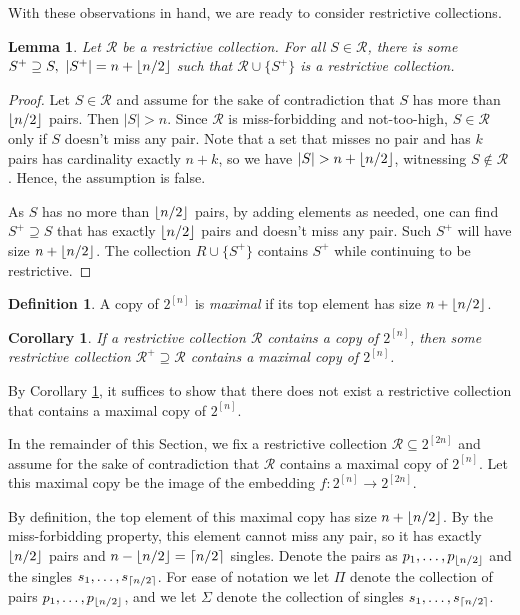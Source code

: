 \documentclass[12pt]{article}
\newtheorem{cor}[thm]{Corollary}
\newtheorem{lem}[thm]{Lemma}
\theoremstyle{definition}
\newtheorem{defi}[thm]{Definition}
\newcommand{\R}{\mathcal{R}}
\newcommand{\bp}{\begin{proof}}
\newcommand{\ep}{\end{proof}}
\newcommand{\dcube}{2^{[2n]}}
\newcommand{\cube}{2^{[n]}}
\newcommand{\ceilh}{\ceil{n/2}}
\newcommand{\floorh}{\floor{n/2}}
\DeclarePairedDelimiter\ceil{\lceil}{\rceil}
\DeclarePairedDelimiter\floor{\lfloor}{\rfloor}
\begin{document}
With these observations in hand, we are ready to consider restrictive collections.

\begin{lem}
Let $\R$ be a restrictive collection. For all $S \in \R$, there is some $S^+\supseteq S,\ |S^+|=n+\floorh$ such that $\R \cup \{S^+\} $ is a restrictive collection.
\end{lem}
\bp
Let $ S \in \R$ and
assume for the sake of contradiction that
$S$ has more than $\floorh$ pairs. Then $|S| > n$. Since $\R$ is miss-forbidding and not-too-high, $S\in \R$ only if $S$ doesn't miss any pair. Note that a set that misses no pair and has $k$ pairs has cardinality exactly $n+k$, so we have $|S|>n+\floorh$, witnessing $S\notin \R$. Hence, the assumption is false.

As $S$ has no more than $\floorh$ pairs, by adding elements as needed, one can find $S^+\supseteq S$ that has exactly $\floorh$ pairs and doesn't miss any pair. Such $S^+$ will have size $n+\floorh$. The collection $R\cup\{S^+\}$ contains $S^+$ while continuing to be restrictive.
\ep

\begin{defi}
A copy of $\cube$ is \textit{maximal} if its top element has size $n+\floorh$.
\end{defi}

\begin{cor}\label{corollary:tomax}
If a restrictive collection $\R$ contains a copy of $\cube$, then some restrictive collection $\R^+\supseteq \R$ contains a maximal copy of $\cube$.
\end{cor}

By Corollary \ref{corollary:tomax}, it suffices to show that there does not exist a restrictive collection that contains a maximal copy of $ \cube.$

In the remainder of this Section, we fix a restrictive collection $\R \subseteq \dcube$ and assume for the sake of contradiction that $\R$ contains a maximal copy of $\cube$. Let this maximal copy be the image of the embedding $ f : 2^{[n]} \to 2^{[2n]}$. 

By definition, the top element of this maximal copy has size $n+\floorh$. By the miss-forbidding property, this element cannot miss any pair, so it has exactly $\floorh$ pairs and $n-\floorh = \ceilh$ singles. Denote the pairs as $p_1,\dots, p_{\floorh}$ and the singles $s_1,\dots, s_{\ceilh}$. %
For ease of notation we let $\Pi$ denote the collection of pairs $p_1,\dots,p_{\floorh}$, and we let $\Sigma$ denote the collection of singles 
$s_1,\dots,s_{\ceilh}$.
\end{document}
